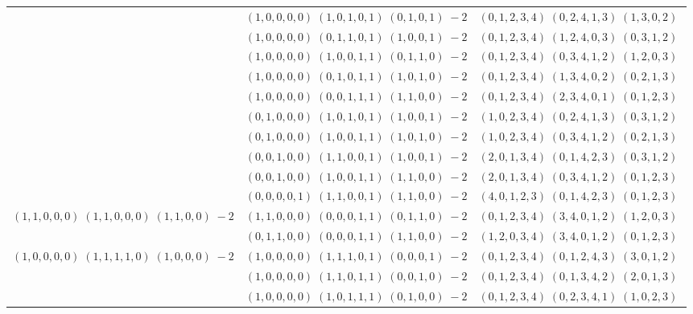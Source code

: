 \documentclass[11pt]{article}
\begin{document}
\begin{longtable}[l]{|c|c|c|}
 \cline{2-3} 
 & $(1 ,0 ,0 ,0 ,0) \;(1 ,0 ,1 ,0 ,1) \;(0 ,1 ,0 ,1) \;-2$ & $(0 ,1 ,2 ,3 ,4) \;(0 ,2 ,4 ,1 ,3) \;(1 ,3 ,0 ,2) \;$\\ 
 \cline{2-3} 
 & $(1 ,0 ,0 ,0 ,0) \;(0 ,1 ,1 ,0 ,1) \;(1 ,0 ,0 ,1) \;-2$ & $(0 ,1 ,2 ,3 ,4) \;(1 ,2 ,4 ,0 ,3) \;(0 ,3 ,1 ,2) \;$\\ 
 \cline{2-3} 
 & $(1 ,0 ,0 ,0 ,0) \;(1 ,0 ,0 ,1 ,1) \;(0 ,1 ,1 ,0) \;-2$ & $(0 ,1 ,2 ,3 ,4) \;(0 ,3 ,4 ,1 ,2) \;(1 ,2 ,0 ,3) \;$\\ 
 \cline{2-3} 
 & $(1 ,0 ,0 ,0 ,0) \;(0 ,1 ,0 ,1 ,1) \;(1 ,0 ,1 ,0) \;-2$ & $(0 ,1 ,2 ,3 ,4) \;(1 ,3 ,4 ,0 ,2) \;(0 ,2 ,1 ,3) \;$\\ 
 \cline{2-3} 
 & $(1 ,0 ,0 ,0 ,0) \;(0 ,0 ,1 ,1 ,1) \;(1 ,1 ,0 ,0) \;-2$ & $(0 ,1 ,2 ,3 ,4) \;(2 ,3 ,4 ,0 ,1) \;(0 ,1 ,2 ,3) \;$\\ 
 \cline{2-3} 
 & $(0 ,1 ,0 ,0 ,0) \;(1 ,0 ,1 ,0 ,1) \;(1 ,0 ,0 ,1) \;-2$ & $(1 ,0 ,2 ,3 ,4) \;(0 ,2 ,4 ,1 ,3) \;(0 ,3 ,1 ,2) \;$\\ 
 \cline{2-3} 
 & $(0 ,1 ,0 ,0 ,0) \;(1 ,0 ,0 ,1 ,1) \;(1 ,0 ,1 ,0) \;-2$ & $(1 ,0 ,2 ,3 ,4) \;(0 ,3 ,4 ,1 ,2) \;(0 ,2 ,1 ,3) \;$\\ 
 \cline{2-3} 
 & $(0 ,0 ,1 ,0 ,0) \;(1 ,1 ,0 ,0 ,1) \;(1 ,0 ,0 ,1) \;-2$ & $(2 ,0 ,1 ,3 ,4) \;(0 ,1 ,4 ,2 ,3) \;(0 ,3 ,1 ,2) \;$\\ 
 \cline{2-3} 
 & $(0 ,0 ,1 ,0 ,0) \;(1 ,0 ,0 ,1 ,1) \;(1 ,1 ,0 ,0) \;-2$ & $(2 ,0 ,1 ,3 ,4) \;(0 ,3 ,4 ,1 ,2) \;(0 ,1 ,2 ,3) \;$\\ 
 \cline{2-3} 
 & $(0 ,0 ,0 ,0 ,1) \;(1 ,1 ,0 ,0 ,1) \;(1 ,1 ,0 ,0) \;-2$ & $(4 ,0 ,1 ,2 ,3) \;(0 ,1 ,4 ,2 ,3) \;(0 ,1 ,2 ,3) \;$\\ \hline\multirow[t]{2}{*}{ $(1 ,1 ,0 ,0 ,0) \;(1 ,1 ,0 ,0 ,0) \;(1 ,1 ,0 ,0) \;-2$ }  & $(1 ,1 ,0 ,0 ,0) \;(0 ,0 ,0 ,1 ,1) \;(0 ,1 ,1 ,0) \;-2$ & $(0 ,1 ,2 ,3 ,4) \;(3 ,4 ,0 ,1 ,2) \;(1 ,2 ,0 ,3) \;$\\ 
 \cline{2-3} 
 & $(0 ,1 ,1 ,0 ,0) \;(0 ,0 ,0 ,1 ,1) \;(1 ,1 ,0 ,0) \;-2$ & $(1 ,2 ,0 ,3 ,4) \;(3 ,4 ,0 ,1 ,2) \;(0 ,1 ,2 ,3) \;$\\ \hline\multirow[t]{8}{*}{ $(1 ,0 ,0 ,0 ,0) \;(1 ,1 ,1 ,1 ,0) \;(1 ,0 ,0 ,0) \;-2$ }  & $(1 ,0 ,0 ,0 ,0) \;(1 ,1 ,1 ,0 ,1) \;(0 ,0 ,0 ,1) \;-2$ & $(0 ,1 ,2 ,3 ,4) \;(0 ,1 ,2 ,4 ,3) \;(3 ,0 ,1 ,2) \;$\\ 
 \cline{2-3} 
 & $(1 ,0 ,0 ,0 ,0) \;(1 ,1 ,0 ,1 ,1) \;(0 ,0 ,1 ,0) \;-2$ & $(0 ,1 ,2 ,3 ,4) \;(0 ,1 ,3 ,4 ,2) \;(2 ,0 ,1 ,3) \;$\\ 
 \cline{2-3} 
 & $(1 ,0 ,0 ,0 ,0) \;(1 ,0 ,1 ,1 ,1) \;(0 ,1 ,0 ,0) \;-2$ & $(0 ,1 ,2 ,3 ,4) \;(0 ,2 ,3 ,4 ,1) \;(1 ,0 ,2 ,3) \;$\\ 

\end{longtable}
\end{document}
